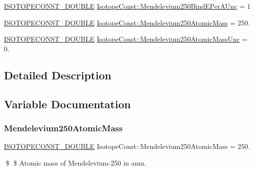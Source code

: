 \begin{DoxyCompactItemize}
\item 
\mbox{\hyperlink{group___isotope_const-_macros_ga8f45a7272ce02c0b4c65c44636ed719a}{I\+S\+O\+T\+O\+P\+E\+C\+O\+N\+S\+T\+\_\+\+D\+O\+U\+B\+LE}} \mbox{\hyperlink{group___isotope_const-_mendelevium-_md250_gad1c4c5efbc2fd4a141489d53e1a8344a}{Isotope\+Const\+::\+Mendelevium250\+Bind\+E\+Per\+A\+Unc}} = 1
\item 
\mbox{\hyperlink{group___isotope_const-_macros_ga8f45a7272ce02c0b4c65c44636ed719a}{I\+S\+O\+T\+O\+P\+E\+C\+O\+N\+S\+T\+\_\+\+D\+O\+U\+B\+LE}} \mbox{\hyperlink{group___isotope_const-_mendelevium-_md250_ga99b92bd75224dad11f2018316a68a8aa}{Isotope\+Const\+::\+Mendelevium250\+Atomic\+Mass}} = 250.
\item 
\mbox{\hyperlink{group___isotope_const-_macros_ga8f45a7272ce02c0b4c65c44636ed719a}{I\+S\+O\+T\+O\+P\+E\+C\+O\+N\+S\+T\+\_\+\+D\+O\+U\+B\+LE}} \mbox{\hyperlink{group___isotope_const-_mendelevium-_md250_gaf8d8827f2b20b2b6f8e14d9c78542efa}{Isotope\+Const\+::\+Mendelevium250\+Atomic\+Mass\+Unc}} = 0.
\end{DoxyCompactItemize}


\subsection{Detailed Description}


\subsection{Variable Documentation}
\mbox{\label{group___isotope_const-_mendelevium-_md250_ga99b92bd75224dad11f2018316a68a8aa}} 
\subsubsection{\texorpdfstring{Mendelevium250\+Atomic\+Mass}{Mendelevium250AtomicMass}}
{\footnotesize\ttfamily \mbox{\hyperlink{group___isotope_const-_macros_ga8f45a7272ce02c0b4c65c44636ed719a}{I\+S\+O\+T\+O\+P\+E\+C\+O\+N\+S\+T\+\_\+\+D\+O\+U\+B\+LE}} Isotope\+Const\+::\+Mendelevium250\+Atomic\+Mass = 250.}

\$ \$ Atomic mass of Mendelevium-\/250 in amu. \mbox{\label{group___isotope_const-_mendelevium-_md250_gaf8d8827f2b20b2b6f8e14d9c78542efa}} 
